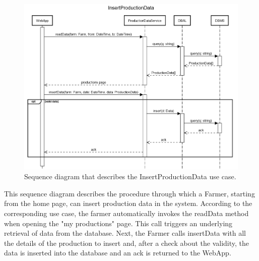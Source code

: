 \documentclass{article}
\begin{document}
\newpage
\begin{figure}[H]
   \centering
   \includegraphics[scale=0.40]{diagrams/sequence diagrams/InsertProductionData.png}
    \caption{Sequence diagram that describes the InsertProductionData use case.}
\end{figure}
This sequence diagram describes the procedure through which a Farmer, starting from the home page, can insert production data in the system. According to the corresponding use case, the farmer automatically invokes the readData method when opening the "my productions" page. This call triggers an underlying retrieval of data from the database. Next, the Farmer calls insertData with all the details of the production to insert and, after a check about the validity, the data is inserted into the database and an ack is returned to the WebApp.
\end{document}
